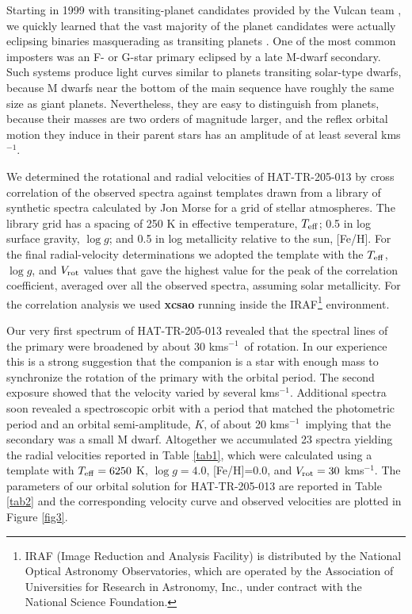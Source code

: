 \documentclass[12pt, preprint]{aastex}
\newcommand\kms{\ifmmode{\rm km\thinspace s^{-1}}\else km\thinspace s$^{-1}$\fi}
\begin{document}
Starting in 1999 with transiting-planet candidates provided by the
Vulcan team \citep{borucki2001}, we quickly learned that the vast
majority of the planet candidates were actually eclipsing binaries
masquerading as transiting planets \citep{latham2003}. One of the
most common imposters was an F- or G-star primary eclipsed by a late
M-dwarf secondary. Such systems produce light curves similar to
planets transiting solar-type dwarfs, because M dwarfs near the bottom
of the main sequence have roughly the same size as giant planets.
Nevertheless, they are easy to distinguish from planets, because their
masses are two orders of magnitude larger, and the reflex
orbital motion they induce in their parent stars has an amplitude of
at least several \kms.

We determined the rotational and radial velocities of HAT-TR-205-013
by cross correlation of the observed spectra against templates drawn
from a library of synthetic spectra calculated by Jon Morse for a grid
of \citet{Kurucz92} stellar atmospheres. The library grid has a
spacing of 250 K in effective temperature, $T_{\rm eff}$; 0.5 in log
surface gravity, $\log g$; and 0.5 in log metallicity relative to the
sun, [Fe/H].  For the final radial-velocity determinations we adopted
the template with the $T_{\rm eff}$, $\log g$, and $V_{\rm rot}$
values that gave the highest value for the peak of the correlation
coefficient, averaged over all the observed spectra, assuming solar
metallicity. For the correlation analysis we used  {\bf xcsao}
\citep{KurtM98} running inside the IRAF\footnote{IRAF (Image Reduction
and Analysis Facility) is distributed by the National Optical
Astronomy Observatories, which are operated by the Association of
Universities for Research in Astronomy, Inc., under contract with the
National Science Foundation.} environment.

Our very first spectrum of HAT-TR-205-013 revealed that the spectral
lines of the primary were broadened by about 30 \kms\ of rotation.  In
our experience this is a strong suggestion that the companion is a
star with enough mass to synchronize the rotation of the primary with
the orbital period. The second exposure showed that the velocity
varied by several \kms.  Additional spectra soon revealed a
spectroscopic orbit with a period that matched the photometric period
and an orbital semi-amplitude, $K$, of about 20 \kms\, implying that
the secondary was a small M dwarf. Altogether we accumulated 23
spectra yielding the radial velocities reported in Table \ref{tab1},
which were calculated using a template with $T_{\rm eff}=6250$ K,
$\log g=4.0$, [Fe/H]=0.0, and $V_{\rm rot} = 30$ \kms.  The parameters
of our orbital solution for HAT-TR-205-013 are reported in Table
\ref{tab2} and the corresponding velocity curve and observed
velocities are plotted in Figure \ref{fig3}.
\end{document}
